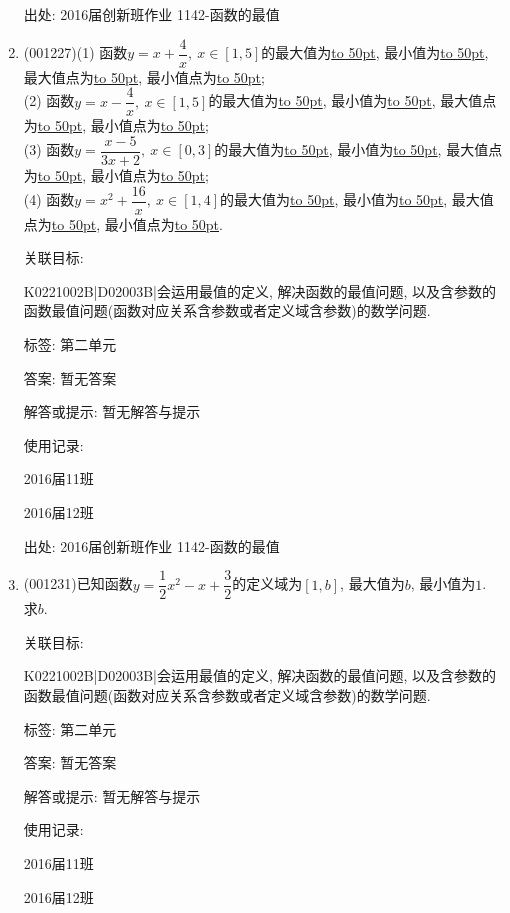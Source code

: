 \documentclass[10pt,a4paper]{article}
\newcommand{\blank}[1]{\underline{\hbox to #1pt{}}}
\begin{document}
\begin{enumerate}[1.]
出处: 2016届创新班作业	1142-函数的最值
\item { (001227)}(1) 函数$y=x+\dfrac{4}{x}, \ x\in [1,5]$的最大值为\blank{50}, 最小值为\blank{50}, 最大值点为\blank{50}, 最小值点为\blank{50};\\ 
(2) 函数$y=x-\dfrac{4}{x}, \ x\in [1,5]$的最大值为\blank{50}, 最小值为\blank{50}, 最大值点为\blank{50}, 最小值点为\blank{50};\\ 
(3) 函数$y=\dfrac{x-5}{3x+2}, \ x\in [0,3]$的最大值为\blank{50}, 最小值为\blank{50}, 最大值点为\blank{50}, 最小值点为\blank{50};\\ 
(4) 函数$y=x^2+\dfrac{16}{x}, \ x\in [1,4]$的最大值为\blank{50}, 最小值为\blank{50}, 最大值点为\blank{50}, 最小值点为\blank{50}.


关联目标:

K0221002B|D02003B|会运用最值的定义, 解决函数的最值问题, 以及含参数的函数最值问题(函数对应关系含参数或者定义域含参数)的数学问题.



标签: 第二单元

答案: 暂无答案

解答或提示: 暂无解答与提示

使用记录:

2016届11班				

2016届12班				


出处: 2016届创新班作业	1142-函数的最值
\item { (001231)}已知函数$y=\dfrac{1}{2}x^2-x+\dfrac{3}{2}$的定义域为$[1,b]$, 最大值为$b$, 最小值为$1$. 求$b$.


关联目标:

K0221002B|D02003B|会运用最值的定义, 解决函数的最值问题, 以及含参数的函数最值问题(函数对应关系含参数或者定义域含参数)的数学问题.



标签: 第二单元

答案: 暂无答案

解答或提示: 暂无解答与提示

使用记录:

2016届11班	

2016届12班	



\end{enumerate}
\end{document}
